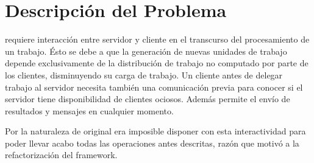 \section{Descripción del Problema}

\rc{} requiere interacción entre servidor y cliente en el transcurso del procesamiento de un trabajo. Ésto se debe a que la generación de
nuevas unidades de trabajo depende exclusivamente de la distribución de trabajo no computado por parte de los clientes, disminuyendo su
carga de trabajo. Un cliente antes de delegar trabajo al servidor necesita también una comunicación previa para conocer si
el servidor tiene disponibilidad de clientes ociosos. Además \rc{} permite el envío de resultados y mensajes en cualquier momento.

Por la naturaleza de \fud{} original era imposible disponer con esta interactividad para poder llevar acabo todas las operaciones antes
descritas, razón que motivó a la refactorización del framework.


